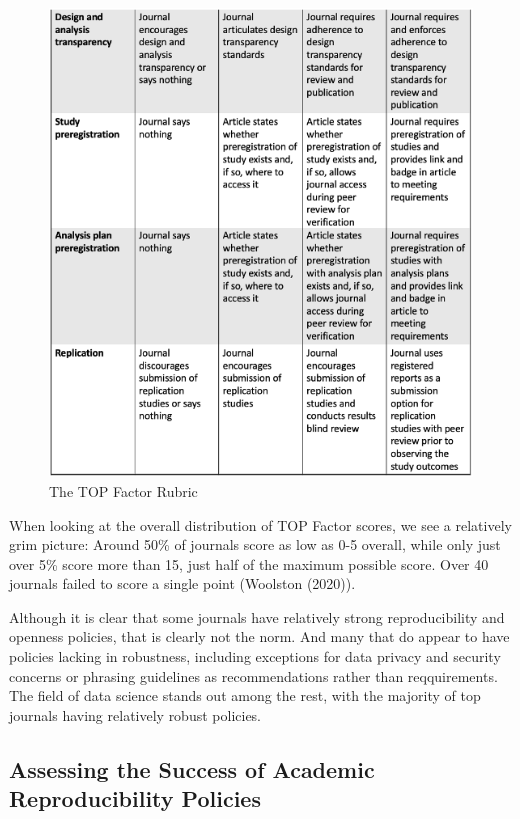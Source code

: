 \documentclass[12pt,twoside]{reedthesis}
\begin{document}
\begin{figure}

{\centering \includegraphics[width=1\linewidth]{figure/top-2} 

}

\caption{The TOP Factor Rubric}\label{fig:top-factor2}
\end{figure}
When looking at the overall distribution of TOP Factor scores, we see a
relatively grim picture: Around 50\% of journals score as low as 0-5
overall, while only just over 5\% score more than 15, just half of the
maximum possible score. Over 40 journals failed to score a single point
(Woolston (2020)).

Although it is clear that some journals have relatively strong
reproducibility and openness policies, that is clearly not the norm. And
many that do appear to have policies lacking in robustness, including
exceptions for data privacy and security concerns or phrasing guidelines
as recommendations rather than reqquirements. The field of data science
stands out among the rest, with the majority of top journals having
relatively robust policies.

\subsection{Assessing the Success of Academic Reproducibility
Policies}\label{assessing-the-success-of-academic-reproducibility-policies}
\end{document}
